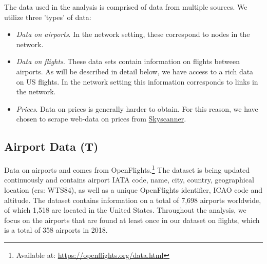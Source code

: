 \label{sec:data}
The data used in the analysis is comprised of data from multiple sources. We utilize three 'types' of data:
\begin{itemize}
    \item \textit{Data on airports}. In the network setting, these correspond to nodes in the network. 
    \item \textit{Data on flights}. These data sets contain information on flights between airports. As will be described in detail below, we have access to a rich data on US flights. In the network setting this information corresponds to links in the network.
    \item \textit{Prices}. Data on prices is generally harder to obtain. For this reason, we have chosen to scrape web-data on prices from \href{https://skyscanner.com}{Skyscanner}.
\end{itemize}

\subsection{Airport Data (T)}
Data on airports and comes from OpenFlights.\footnote{Available at: \url{https://openflights.org/data.html}} The dataset is being updated continuously and contains airport IATA code, name, city, country, geographical location (crs: WTS84), as well as a unique OpenFlights identifier, ICAO code and altitude. The dataset contains information on a total of 7,698 airports worldwide, of which 1,518 are located in the United States. Throughout the analysis, we focus on the airports that are found at least once in our dataset on flights, which is a total of 358 airports in 2018.

